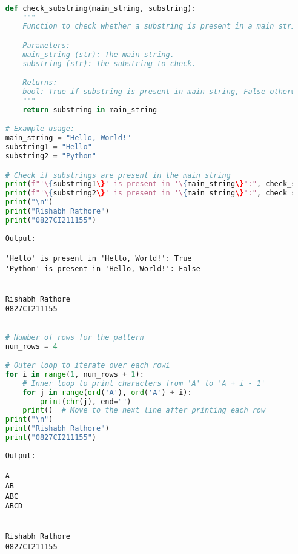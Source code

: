 \documentclass{report}
\begin{document}
\sol{}
\begin{lstlisting}[language=Python]

	def check_substring(main_string, substring):
		"""
		Function to check whether a substring is present in a main string.

		Parameters:
		main_string (str): The main string.
		substring (str): The substring to check.

		Returns:
		bool: True if substring is present in main string, False otherwise.
		"""
		return substring in main_string

	# Example usage:
	main_string = "Hello, World!"
	substring1 = "Hello"
	substring2 = "Python"

	# Check if substrings are present in the main string
	print(f"'\{substring1\}' is present in '\{main_string\}':", check_substring(main_string, substring1))
	print(f"'\{substring2\}' is present in '\{main_string\}':", check_substring(main_string, substring2))
	print("\n")
	print("Rishabh Rathore")
	print("0827CI211155")

\end{lstlisting}

\begin{verbatim}
	Output:
	
	'Hello' is present in 'Hello, World!': True
	'Python' is present in 'Hello, World!': False
	
	
	Rishabh Rathore
	0827CI211155
\end{verbatim}
\bigskip


\sol{}
\begin{lstlisting}[language=Python]

	# Number of rows for the pattern
	num_rows = 4

	# Outer loop to iterate over each rowi
	for i in range(1, num_rows + 1):
		# Inner loop to print characters from 'A' to 'A + i - 1'
		for j in range(ord('A'), ord('A') + i):
			print(chr(j), end="")
		print()  # Move to the next line after printing each row
	print("\n")
	print("Rishabh Rathore")
	print("0827CI211155")
\end{lstlisting}

\begin{verbatim}
	Output:

	A
	AB
	ABC
	ABCD
	
	
	Rishabh Rathore
	0827CI211155

\end{verbatim}
\bigskip
\end{document}
